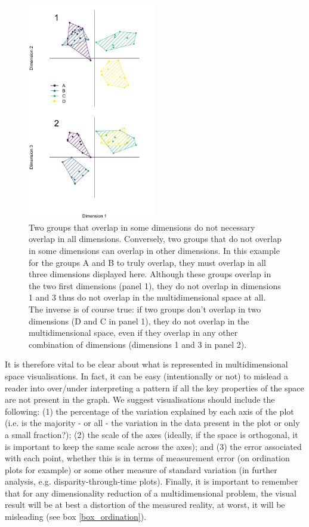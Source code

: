\documentclass[12pt,letterpaper]{article}
\begin{document}
\begin{figure}[!htbp]
\centering
   \includegraphics[width=0.5\textwidth]{Figures/dimensionsOverlap.pdf}
\caption{\small{Two groups that overlap in some dimensions do not necessary overlap in all dimensions. 
Conversely, two groups that do not overlap in some dimensions can overlap in other dimensions.
In this example for the groups A and B to truly overlap, they must overlap in all three dimensions displayed here.
Although these groups overlap in the two first dimensions (panel 1), they do not overlap in dimensions 1 and 3 thus do not overlap in the multidimensional space at all.
The inverse is of course true: if two groups don't overlap in two dimensions (D and C in panel 1), they do not overlap in the multidimensional space, even if they overlap in any other combination of dimensions (dimensions 1 and 3 in panel 2).}} 
\label{Fig:RF_results_best}
\end{figure}

It is therefore vital to be clear about what is represented in multidimensional space visualisations.
In fact, it can be easy (intentionally or not) to mislead a reader into over/under interpreting a pattern if all the key properties of the space are not present in the graph.
We suggest visualisations should include the following:
(1) the percentage of the variation explained by each axis of the plot (i.e. is the majority - or all - the variation in the data present in the plot or only a small fraction?);
(2) the scale of the axes (ideally, if the space is orthogonal, it is important to keep the same scale across the axes);
and (3) the error associated with each point, whether this is in terms of measurement error (on ordination plots for example) or some other measure of standard variation (in further analysis, e.g. disparity-through-time plots).
Finally, it is important to remember that for any dimensionality reduction of a multidimensional problem, the visual result will be at best a distortion of the measured reality, at worst, it will be misleading (see box \ref{box_ordination}).
\end{document}
